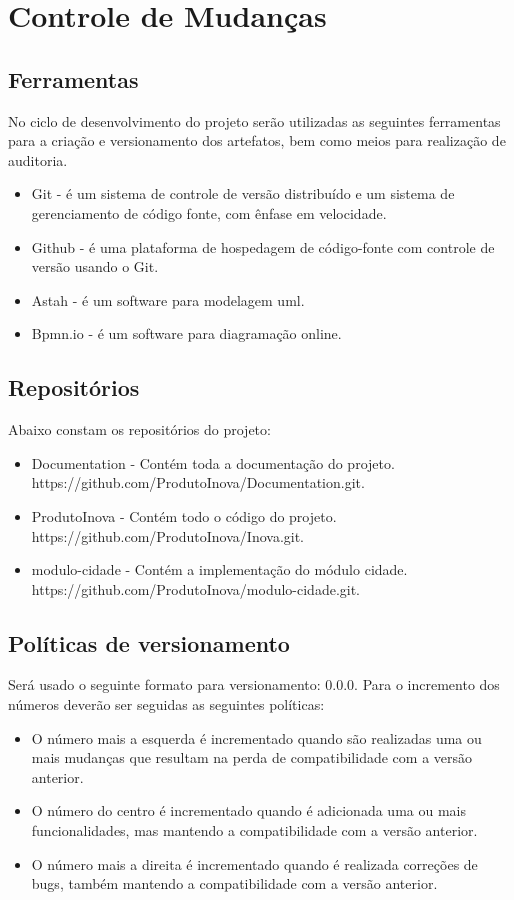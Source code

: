 \documentclass{article}
\begin{document}
    \section{Controle de Mudanças}
    	\subsection{Ferramentas}
        No ciclo de desenvolvimento do projeto serão utilizadas as seguintes ferramentas para a criação e versionamento dos artefatos, bem como meios para realização de auditoria.
        \begin{itemize}
          \item Git - é um sistema de controle de versão distribuído e um sistema de gerenciamento de código fonte, com ênfase em velocidade. 
          \item Github - é uma plataforma de hospedagem de código-fonte com controle de versão usando o Git.
          \item Astah - é um software para modelagem uml. 
          \item Bpmn.io - é um software para diagramação online.
        \end{itemize}
         \subsection{Repositórios}
         Abaixo constam os repositórios do projeto:
	         \begin{itemize}
		         \item Documentation - Contém toda a documentação do projeto. https://github.com/ProdutoInova/Documentation.git.
		         \item ProdutoInova - Contém todo o código do projeto. https://github.com/ProdutoInova/Inova.git.
		         \item modulo-cidade - Contém a implementação do módulo cidade. https://github.com/ProdutoInova/modulo-cidade.git.
		      \end{itemize}
        \subsection{Políticas de versionamento}
        Será usado o seguinte formato para versionamento: 0.0.0. Para o incremento dos números deverão ser seguidas as seguintes políticas:
        \begin{itemize}
        	\item O número mais a esquerda é incrementado quando são realizadas uma ou mais mudanças que resultam na perda de compatibilidade com a versão anterior.
			\item O número do centro é incrementado quando é adicionada uma ou mais funcionalidades, mas mantendo a compatibilidade com a versão anterior. 
			\item O número mais a direita é incrementado quando é realizada correções de bugs, também mantendo a compatibilidade com a versão anterior. 
		\end{itemize}
\end{document}
